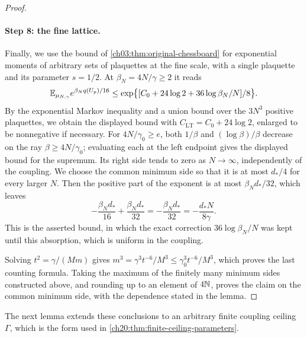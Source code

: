 \begin{proof}
\paragraph{Step 8: the fine lattice.}
Finally, we use the bound of \cref{ch03:thm:original-chessboard} for exponential moments of arbitrary sets of plaquettes at the fine scale, with a single plaquette and its parameter $s=1/2$. At $\beta_N=4N/\gamma\ge2$ it reads
\[
 \mathbb E_{\mu_{N,\gamma}}e^{\beta_Nq(U_p)/16}\le\exp\bigl\{[C_0+24\log2+36\log\beta_N/N]/8\bigr\}.
\]
By the exponential Markov inequality and a union bound over the $3N^3$ positive plaquettes, we obtain the displayed bound with $C_{\mathrm{LT}}=C_0+24\log2$, enlarged to be nonnegative if necessary. For $4N/\gamma_0\ge e$, both $1/\beta$ and $(\log\beta)/\beta$ decrease on the ray $\beta\ge4N/\gamma_0$; evaluating each at the left endpoint gives the displayed bound for the supremum. Its right side tends to zero as $N\to\infty$, independently of the coupling. We choose the common minimum side so that it is at most $d_*/4$ for every larger $N$. Then the positive part of the exponent is at most $\beta_Nd_*/32$, which leaves
\[
 -\frac{\beta_Nd_*}{16}+\frac{\beta_Nd_*}{32}=-\frac{\beta_Nd_*}{32}=-\frac{d_*N}{8\gamma}.
\]
This is the asserted bound, in which the exact correction $36\log\beta_N/N$ was kept until this absorption, which is uniform in the coupling.

Solving $t^2=\gamma/(Mm)$ gives $m^3=\gamma^3t^{-6}/M^3\le\gamma_0^3t^{-6}/M^3$, which proves the last counting formula. Taking the maximum of the finitely many minimum sides constructed above, and rounding up to an element of $4\mathbb N$, proves the claim on the common minimum side, with the dependence stated in the lemma.
\end{proof}

The next lemma extends these conclusions to an arbitrary finite coupling ceiling $\Gamma$, which is the form used in \cref{ch20:thm:finite-ceiling-parameters}.


